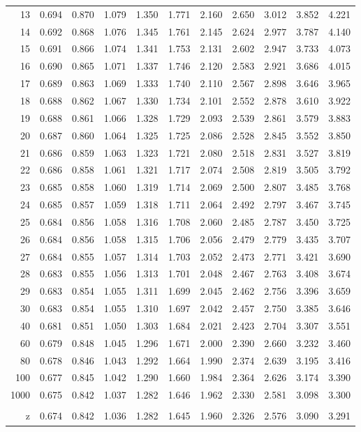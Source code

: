 \documentclass[12pt,a4paper]{article}
\makeatletter
\renewenvironment{table}[1][]{%
 \ifthenelse{\equal{#1}{}}{%
   \@float{table}
 }{%
   \@float{table}[#1]%
 }%
 \centering
}{%
 \end@float
}
\makeatother
\begin{document}
\begin{table}[!htbp]
\begin{tabularx}{\textwidth}{ r|YYYYYYYYYY}
13 & 0.694 & 0.870 & 1.079 & 1.350 & 1.771 & 2.160 & 2.650 & 3.012 & 3.852 & 4.221 \\
14 & 0.692 & 0.868 & 1.076 & 1.345 & 1.761 & 2.145 & 2.624 & 2.977 & 3.787 & 4.140 \\
15 & 0.691 & 0.866 & 1.074 & 1.341 & 1.753 & 2.131 & 2.602 & 2.947 & 3.733 & 4.073 \\
16 & 0.690 & 0.865 & 1.071 & 1.337 & 1.746 & 2.120 & 2.583 & 2.921 & 3.686 & 4.015 \\
17 & 0.689 & 0.863 & 1.069 & 1.333 & 1.740 & 2.110 & 2.567 & 2.898 & 3.646 & 3.965 \\
18 & 0.688 & 0.862 & 1.067 & 1.330 & 1.734 & 2.101 & 2.552 & 2.878 & 3.610 & 3.922 \\
19 & 0.688 & 0.861 & 1.066 & 1.328 & 1.729 & 2.093 & 2.539 & 2.861 & 3.579 & 3.883 \\
20 & 0.687 & 0.860 & 1.064 & 1.325 & 1.725 & 2.086 & 2.528 & 2.845 & 3.552 & 3.850 \\
21 & 0.686 & 0.859 & 1.063 & 1.323 & 1.721 & 2.080 & 2.518 & 2.831 & 3.527 & 3.819 \\
22 & 0.686 & 0.858 & 1.061 & 1.321 & 1.717 & 2.074 & 2.508 & 2.819 & 3.505 & 3.792 \\
23 & 0.685 & 0.858 & 1.060 & 1.319 & 1.714 & 2.069 & 2.500 & 2.807 & 3.485 & 3.768 \\
24 & 0.685 & 0.857 & 1.059 & 1.318 & 1.711 & 2.064 & 2.492 & 2.797 & 3.467 & 3.745 \\
25 & 0.684 & 0.856 & 1.058 & 1.316 & 1.708 & 2.060 & 2.485 & 2.787 & 3.450 & 3.725 \\
26 & 0.684 & 0.856 & 1.058 & 1.315 & 1.706 & 2.056 & 2.479 & 2.779 & 3.435 & 3.707 \\
27 & 0.684 & 0.855 & 1.057 & 1.314 & 1.703 & 2.052 & 2.473 & 2.771 & 3.421 & 3.690 \\
28 & 0.683 & 0.855 & 1.056 & 1.313 & 1.701 & 2.048 & 2.467 & 2.763 & 3.408 & 3.674 \\
29 & 0.683 & 0.854 & 1.055 & 1.311 & 1.699 & 2.045 & 2.462 & 2.756 & 3.396 & 3.659 \\
30 & 0.683 & 0.854 & 1.055 & 1.310 & 1.697 & 2.042 & 2.457 & 2.750 & 3.385 & 3.646 \\
40 & 0.681 & 0.851 & 1.050 & 1.303 & 1.684 & 2.021 & 2.423 & 2.704 & 3.307 & 3.551 \\
60 & 0.679 & 0.848 & 1.045 & 1.296 & 1.671 & 2.000 & 2.390 & 2.660 & 3.232 & 3.460 \\
80 & 0.678 & 0.846 & 1.043 & 1.292 & 1.664 & 1.990 & 2.374 & 2.639 & 3.195 & 3.416 \\
100 & 0.677 & 0.845 & 1.042 & 1.290 & 1.660 & 1.984 & 2.364 & 2.626 & 3.174 & 3.390 \\
1000 & 0.675 & 0.842 & 1.037 & 1.282 & 1.646 & 1.962 & 2.330 & 2.581 & 3.098 & 3.300 \\\hline
                &&&&&&&&&&  \\[-1.2ex]
z    & 0.674 & 0.842 & 1.036 & 1.282 & 1.645 & 1.960 & 2.326 & 2.576 & 3.090 & 3.291 \\
    \end{tabularx}  
    \caption{Probabilities under the t-Distribution}
    \label{tbl:t}
\end{table}
\end{document}
